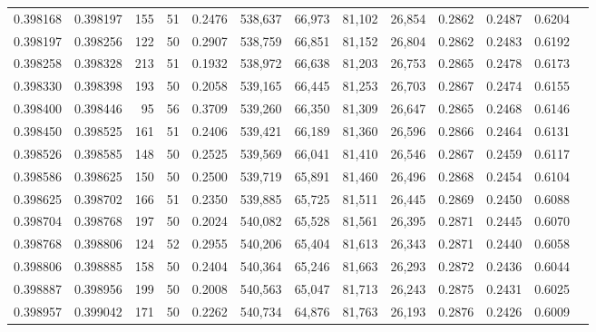 \begin{tabular}{rrrrrrrrrrrrr}
0.398168 & 0.398197 &   155 &  51 &                                     0.2476 & 538,637 &  66,973 &  81,102 &  26,854 & 0.2862 & 0.2487 & 0.6204 \\
0.398197 & 0.398256 &   122 &  50 &                                     0.2907 & 538,759 &  66,851 &  81,152 &  26,804 & 0.2862 & 0.2483 & 0.6192 \\
0.398258 & 0.398328 &   213 &  51 &                                     0.1932 & 538,972 &  66,638 &  81,203 &  26,753 & 0.2865 & 0.2478 & 0.6173 \\
0.398330 & 0.398398 &   193 &  50 &                                     0.2058 & 539,165 &  66,445 &  81,253 &  26,703 & 0.2867 & 0.2474 & 0.6155 \\
0.398400 & 0.398446 &    95 &  56 &                                     0.3709 & 539,260 &  66,350 &  81,309 &  26,647 & 0.2865 & 0.2468 & 0.6146 \\
0.398450 & 0.398525 &   161 &  51 &                                     0.2406 & 539,421 &  66,189 &  81,360 &  26,596 & 0.2866 & 0.2464 & 0.6131 \\
0.398526 & 0.398585 &   148 &  50 &                                     0.2525 & 539,569 &  66,041 &  81,410 &  26,546 & 0.2867 & 0.2459 & 0.6117 \\
0.398586 & 0.398625 &   150 &  50 &                                     0.2500 & 539,719 &  65,891 &  81,460 &  26,496 & 0.2868 & 0.2454 & 0.6104 \\
0.398625 & 0.398702 &   166 &  51 &                                     0.2350 & 539,885 &  65,725 &  81,511 &  26,445 & 0.2869 & 0.2450 & 0.6088 \\
0.398704 & 0.398768 &   197 &  50 &                                     0.2024 & 540,082 &  65,528 &  81,561 &  26,395 & 0.2871 & 0.2445 & 0.6070 \\
0.398768 & 0.398806 &   124 &  52 &                                     0.2955 & 540,206 &  65,404 &  81,613 &  26,343 & 0.2871 & 0.2440 & 0.6058 \\
0.398806 & 0.398885 &   158 &  50 &                                     0.2404 & 540,364 &  65,246 &  81,663 &  26,293 & 0.2872 & 0.2436 & 0.6044 \\
0.398887 & 0.398956 &   199 &  50 &                                     0.2008 & 540,563 &  65,047 &  81,713 &  26,243 & 0.2875 & 0.2431 & 0.6025 \\
0.398957 & 0.399042 &   171 &  50 &                                     0.2262 & 540,734 &  64,876 &  81,763 &  26,193 & 0.2876 & 0.2426 & 0.6009 \\

\end{tabular}
